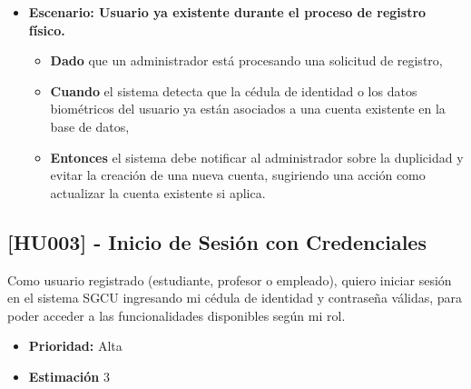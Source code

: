 \documentclass[12pt]{article}
\begin{document}
\begin{itemize}
	\item \textbf{Escenario: Usuario ya existente durante el proceso de registro físico.}
	\begin{itemize}
		\item \textbf{Dado} que un administrador está procesando una solicitud de registro,
		\item \textbf{Cuando} el sistema detecta que la cédula de identidad o los datos biométricos del usuario ya están asociados a una cuenta existente en la base de datos,
		\item \textbf{Entonces} el sistema debe notificar al administrador sobre la duplicidad y evitar la creación de una nueva cuenta, sugiriendo una acción como actualizar la cuenta existente si aplica.
	\end{itemize}
\end{itemize}

\pagebreak

\subsection{[HU003] - Inicio de Sesión con Credenciales}

Como usuario registrado (estudiante, profesor o empleado), quiero iniciar sesión en el sistema SGCU ingresando mi cédula de identidad y contraseña válidas, para poder acceder a las funcionalidades disponibles según mi rol.

\begin{itemize}
	\item \textbf{Prioridad:} Alta
	\item \textbf{Estimación} 3
\end{itemize}
\end{document}
